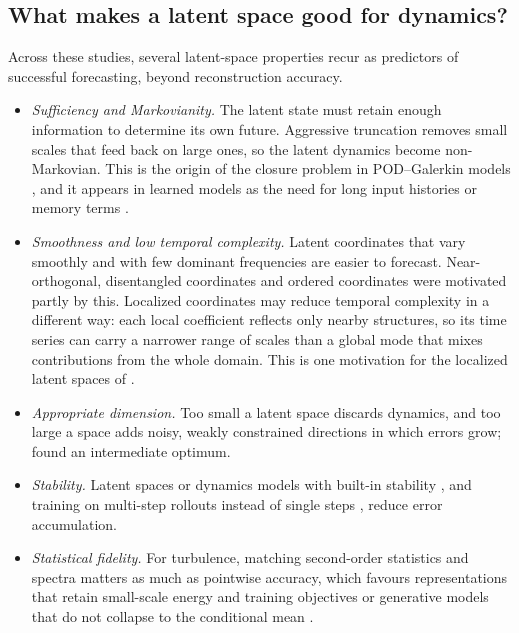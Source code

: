 \subsection{What makes a latent space good for dynamics?}
\label{sec:goodlatent}

Across these studies, several latent-space properties recur as predictors of
successful forecasting, beyond reconstruction accuracy.
\begin{itemize}[leftmargin=1.5em,itemsep=2pt]
  \item \emph{Sufficiency and Markovianity.} The latent state must retain
  enough information to determine its own future. Aggressive truncation removes
  small scales that feed back on large ones, so the latent dynamics become
  non-Markovian. This is the origin of the closure problem in POD--Galerkin
  models \parencite{wang2012closure,ahmed2021closures}, and it appears in
  learned models as the need for long input histories or memory terms
  \parencite{maulik2020timeseries}.
  \item \emph{Smoothness and low temporal complexity.} Latent coordinates that
  vary smoothly and with few dominant frequencies are easier to forecast.
  Near-orthogonal, disentangled coordinates
  \parencite{eivazi2022betavae,solera2024betavae} and ordered coordinates
  \parencite{fukami2020hierarchical} were motivated partly by this. Localized
  coordinates may reduce temporal complexity in a different way: each local
  coefficient reflects only nearby structures, so its time series can carry a
  narrower range of scales than a global mode that mixes contributions from
  the whole domain. This is one motivation for the localized latent spaces of
  \textcite{morton2026scitech}.
  \item \emph{Appropriate dimension.} Too small a latent space discards
  dynamics, and too large a space adds noisy, weakly constrained directions in
  which errors grow; \textcite{linot2022node} found an intermediate optimum.
  \item \emph{Stability.} Latent spaces or dynamics models with built-in
  stability \parencite{pan2020physics,linot2023stabilized}, and training on
  multi-step rollouts instead of single steps
  \parencite{lusch2018koopman,kohl2023acdm}, reduce error accumulation.
  \item \emph{Statistical fidelity.} For turbulence, matching second-order
  statistics and spectra matters as much as pointwise accuracy, which favours
  representations that retain small-scale energy
  \parencite{deshmukh2018energy,glaws2020insitu} and training objectives or
  generative models that do not collapse to the conditional mean
  \parencite{kohl2023acdm,du2024cnf}.
\end{itemize}
